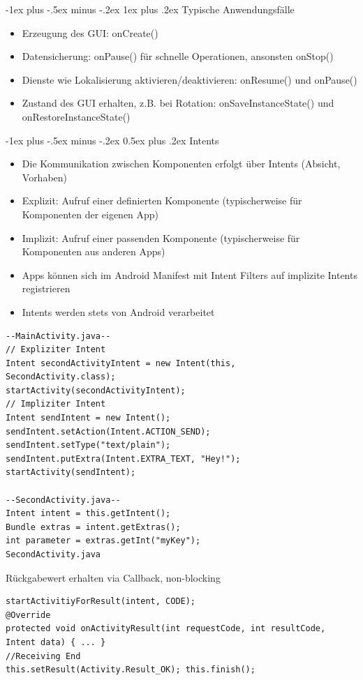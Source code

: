 \documentclass[10pt,landscape,a4paper]{article}
\makeatletter
\renewcommand{\section}{\@startsection{section}{1}{0mm}%
                                {-1ex plus -.5ex minus -.2ex}%
                                {0.5ex plus .2ex}%
                                {\normalfont\large\bfseries}}
\renewcommand{\subsubsection}{\@startsection{subsubsection}{3}{0mm}%
                                {-1ex plus -.5ex minus -.2ex}%
                                {1ex plus .2ex}%
                                {\normalfont\footnotesize\bfseries}}
\makeatother
\begin{document}
\begin{multicols*}{3}
\subsubsection{Typische Anwendungsfälle}
\begin{itemize}[leftmargin=*]
\item{Erzeugung des GUI: onCreate()}
\item{Datensicherung: onPause() für schnelle Operationen, ansonsten onStop()}
\item{Dienste wie Lokalisierung aktivieren/deaktivieren: onResume() und onPause()}
\item{Zustand des GUI erhalten, z.B. bei Rotation: onSaveInstanceState() und onRestoreInstanceState()}
\end{itemize}

\section{Intents}
\begin{itemize}[leftmargin=*]
\item{Die Kommunikation zwischen Komponenten erfolgt über Intents (Absicht, Vorhaben)}
\item{Explizit: Aufruf einer definierten Komponente (typischerweise für Komponenten der eigenen App)}
\item{Implizit: Aufruf einer passenden Komponente (typischerweise für Komponenten aus anderen Apps)}
\item{Apps können sich im Android Manifest mit Intent Filters auf implizite Intents registrieren}
\item{Intents werden stets von Android verarbeitet}
\end{itemize}

\begin{verbatim}
--MainActivity.java--
// Expliziter Intent
Intent secondActivityIntent = new Intent(this,
SecondActivity.class);
startActivity(secondActivityIntent);
// Impliziter Intent
Intent sendIntent = new Intent();
sendIntent.setAction(Intent.ACTION_SEND);
sendIntent.setType("text/plain");
sendIntent.putExtra(Intent.EXTRA_TEXT, "Hey!");
startActivity(sendIntent);

--SecondActivity.java--
Intent intent = this.getIntent();
Bundle extras = intent.getExtras();
int parameter = extras.getInt("myKey");
SecondActivity.java
\end{verbatim}

Rückgabewert erhalten via Callback, non-blocking
\begin{verbatim}
startActivitiyForResult(intent, CODE);
@Override
protected void onActivityResult(int requestCode, int resultCode,
Intent data) { ... }
//Receiving End
this.setResult(Activity.Result_OK); this.finish();
\end{verbatim}


\end{multicols*}
\end{document}
